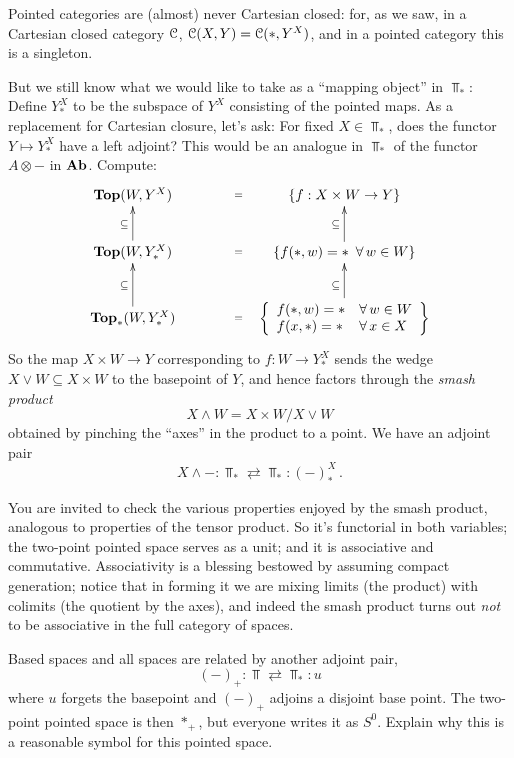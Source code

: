 Pointed categories are (almost) never Cartesian closed: for, as we saw,
in a Cartesian closed category $\mathcal C$, $\mathcal C(X,Y)=\mathcal C(\ast,Y^X)$, and
in a pointed category this is a singleton.

But we still know what we would like to take as a ``mapping object'' 
in $\Top_*$:
Define $Y^X_*$ to be the subspace of $Y^X$ consisting of the pointed maps. 
As a replacement for Cartesian closure, 
let's ask: For fixed $X\in\Top_*$, 
does the functor $Y\mapsto Y^X_\ast$ have a left adjoint? 
This would be an analogue in $\Top_*$ of the functor $A\otimes-$ in $\mathbf{Ab}$. 
Compute:
\[
\xymatrix{
\Top(W,Y^X) \ar@{}[rr]|{=} && \{f:X\times W\to Y\} \\
\Top(W,Y_*^X) \ar@{}[rr]|{=} \ar[u]^\subseteq && 
\{f(*,w)=* \,\,\,\forall \,w\in W\} \ar[u]^\subseteq \\
\Top_*(W,Y_*^X) \ar@{}[rr]|{=} \ar[u]^\subseteq && 
{\left\{\begin{array}{ll}
f(*,w)=*&\forall\,w\in W\\
f(x,*)=*&\forall\,x\in X\end{array}\right\}}
\ar[u]^\subseteq 
}
\]
So the map $X\times W\to Y$ corresponding to $f:W\to Y_*^X$ sends the 
wedge $X\vee W\subseteq X\times W$ to the basepoint of $Y$, and hence
factors through the {\em smash product}
\[
X\wedge W=X\times W/X\vee W
\]
obtained by pinching the ``axes'' in the product to a point. We have an
adjoint pair 
\[
X\wedge-:\Top_*\rightleftarrows\Top_*:(-)^X_*\,.
\]

You are invited to check the various properties enjoyed by the smash product,
analogous to properties of the tensor product. So it's functorial in both
variables; the two-point pointed space serves as a unit; and it is associative
and commutative. Associativity is a blessing bestowed by assuming compact
generation; notice that in forming it we are mixing limits (the product)
with colimits (the quotient by the axes), and indeed the smash product
turns out {\em not} to be associative in the full category of spaces. 

Based spaces and all spaces are related by another adjoint pair, 
\[
(-)_+:\Top\rightleftarrows\Top_*:u
\]
where $u$ forgets the basepoint and $(-)_+$ adjoins a disjoint base point. 
The two-point pointed space is then $*_+$, but everyone writes it as $S^0$. 
Explain why this is a reasonable symbol for this pointed space. 

